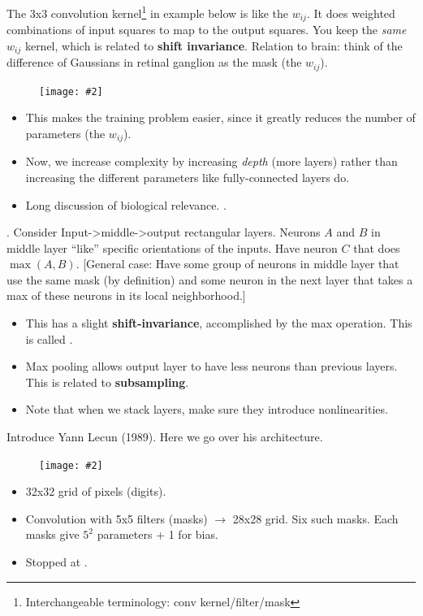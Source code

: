 \documentclass[12pt]{article}
\newcommand\myfig[2][0.3\textwidth]{\begin{figure}[h!]\centering\texttt{[image: \#2]}\end{figure}}
\newcommand{\myspace}{\vspace{2\bigskipamount}}
\newcommand\p{\Needspace{10\baselineskip} \noindent}
\begin{document}
\myspace
\p {} The 3x3 convolution kernel\footnote{Interchangeable terminology: conv kernel/filter/mask} in example below is like the $w_{ij}$. It does weighted combinations of input squares to map to the output squares. You keep the \textit{same} $w_{ij}$ kernel, which is related to \textbf{shift invariance}. Relation to brain: think of the difference of Gaussians in retinal ganglion as the mask (the $w_{ij}$). 

\myfig[0.3\textwidth]{Convolution.PNG}

\begin{itemize}
	\item This makes the training problem easier, since it greatly reduces the number of parameters (the $w_{ij}$). 
	\item Now, we increase complexity by increasing \textit{depth} (more layers) rather than increasing the different parameters like fully-connected layers do. 
	\item Long discussion of biological relevance. . 
\end{itemize}

\myspace
\p {}. Consider Input->middle->output rectangular layers. Neurons $A$ and $B$ in middle layer ``like'' specific orientations of the inputs. Have neuron $C$ that does $\max(A, B)$. [General case: Have some group of neurons in middle layer that use the same mask (by definition) and some neuron in the next layer that takes a max of these neurons in its local neighborhood.] 
\begin{itemize}
	\item This has a slight \textbf{shift-invariance}, accomplished by the max operation. \purple{[56:00]} This is called . 
	\item Max pooling allows output layer to have less neurons than previous layers. This is related to \textbf{subsampling}. 
	\item Note that when we stack layers, make sure they introduce nonlinearities. 
\end{itemize}

\myspace
\p Introduce Yann Lecun (1989). Here we go over his architecture. \myfig[0.5\textwidth]{Lecun.PNG}
\begin{itemize}
	\item 32x32 grid of pixels (digits). 
	\item Convolution with 5x5 filters (masks) $\rightarrow$ 28x28 grid. Six such masks. Each masks give $5^2$ parameters + 1 for bias. 
	\item Stopped at \purple{[1 hour]}. 
\end{itemize}
\end{document}
